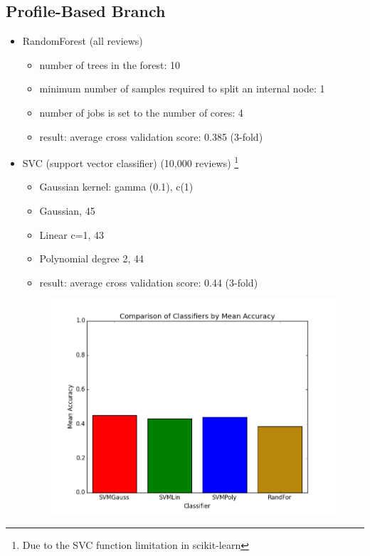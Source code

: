 \subsection{Profile-Based Branch}
\begin{itemize}
	\item RandomForest (all reviews)
	\begin{itemize}
		\item number of trees in the forest: 10
		\item minimum number of samples required to split an internal node: 1
		\item number of jobs is set to the number of cores: 4
		\item result: average cross validation score: 0.385 (3-fold)
	\end{itemize}
	\item SVC (support vector classifier) (10,000 reviews) \footnote{Due to the SVC function limitation in scikit-learn}
	\begin{itemize}
		\item Gaussian kernel: gamma (0.1), c(1)
		\item Gaussian, 45
		\item Linear c=1, 43 
		\item Polynomial degree 2, 44
		\item result: average cross validation score: 0.44 (3-fold)
	\end{itemize}
\begin{figure}[h]
\centering
\includegraphics[width=0.5\linewidth]{profileaccuracy}
\caption{}
\label{fig:profileaccuracy}
\end{figure}

\end{itemize}




